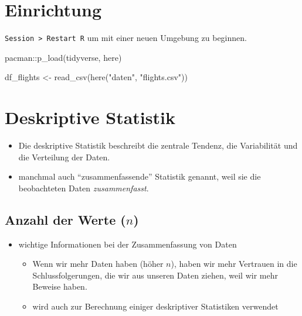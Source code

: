 \documentclass[
  letterpaper,
  DIV=11]{scrartcl}
\newenvironment{Shaded}{\begin{snugshade}}{\end{snugshade}}
\newcommand{\FunctionTok}[1]{\textcolor[rgb]{0.28,0.35,0.67}{#1}}
\newcommand{\NormalTok}[1]{\textcolor[rgb]{0.00,0.23,0.31}{#1}}
\newcommand{\OtherTok}[1]{\textcolor[rgb]{0.00,0.23,0.31}{#1}}
\newcommand{\SpecialCharTok}[1]{\textcolor[rgb]{0.37,0.37,0.37}{#1}}
\newcommand{\StringTok}[1]{\textcolor[rgb]{0.13,0.47,0.30}{#1}}
\providecommand{\tightlist}{%
  \setlength{\itemsep}{0pt}\setlength{\parskip}{0pt}}\usepackage{longtable,booktabs,array}
\begin{document}
\hypertarget{einrichtung}{%
\section{Einrichtung}\label{einrichtung}}

\texttt{Session\ \textgreater{}\ Restart\ R} um mit einer neuen Umgebung
zu beginnen.

\begin{Shaded}
\begin{Highlighting}[]
\NormalTok{pacman}\SpecialCharTok{::}\FunctionTok{p\_load}\NormalTok{(tidyverse,}
\NormalTok{               here)}
\end{Highlighting}
\end{Shaded}

\begin{Shaded}
\begin{Highlighting}[]
\NormalTok{df\_flights }\OtherTok{\textless{}{-}} \FunctionTok{read\_csv}\NormalTok{(}\FunctionTok{here}\NormalTok{(}\StringTok{"daten"}\NormalTok{, }\StringTok{"flights.csv"}\NormalTok{))}
\end{Highlighting}
\end{Shaded}

\hypertarget{deskriptive-statistik}{%
\section{Deskriptive Statistik}\label{deskriptive-statistik}}

\begin{itemize}
\item
  Die deskriptive Statistik beschreibt die zentrale Tendenz, die
  Variabilität und die Verteilung der Daten.
\item
  manchmal auch ``zusammenfassende'' Statistik genannt, weil sie die
  beobachteten Daten \emph{zusammenfasst}.
\end{itemize}

\hypertarget{anzahl-der-werte-n}{%
\subsection{\texorpdfstring{Anzahl der Werte
(\(n\))}{Anzahl der Werte (n)}}\label{anzahl-der-werte-n}}

\begin{itemize}
\tightlist
\item
  wichtige Informationen bei der Zusammenfassung von Daten

  \begin{itemize}
  \tightlist
  \item
    Wenn wir mehr Daten haben (höher \(n\)), haben wir mehr Vertrauen in
    die Schlussfolgerungen, die wir aus unseren Daten ziehen, weil wir
    mehr Beweise haben.
  \item
    wird auch zur Berechnung einiger deskriptiver Statistiken verwendet
  \end{itemize}
\end{itemize}
\end{document}

